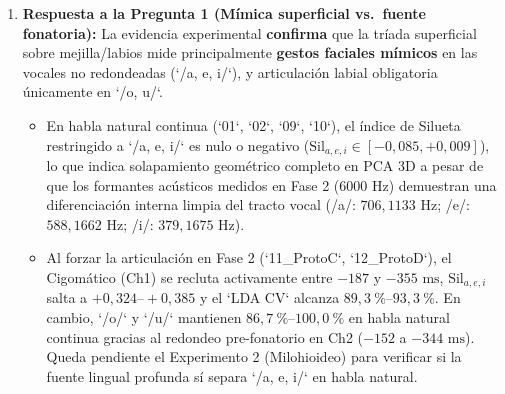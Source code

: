 \documentclass[11pt,a4paper]{article}
\begin{document}
\begin{enumerate}
    \item \textbf{Respuesta a la Pregunta 1 (M\'imica superficial vs.\ fuente fonatoria):} La evidencia experimental \textbf{confirma} que la tr\'iada superficial sobre mejilla/labios mide principalmente \textbf{gestos faciales m\'imicos} en las vocales no redondeadas (`/a, e, i/`), y articulaci\'on labial obligatoria \'unicamente en `/o, u/`.
    \begin{itemize}
        \item En habla natural continua (`01`, `02`, `09`, `10`), el \'indice de Silueta restringido a `/a, e, i/` es nulo o negativo ($\text{Sil}_{a,e,i} \in [-0{,}085, +0{,}009]$), lo que indica solapamiento geom\'etrico completo en PCA 3D a pesar de que los formantes ac\'usticos medidos en Fase 2 ($6000\text{ Hz}$) demuestran una diferenciaci\'on interna limpia del tracto vocal (/a/: $706,1133\text{ Hz}$; /e/: $588,1662\text{ Hz}$; /i/: $379,1675\text{ Hz}$).
        \item Al forzar la articulaci\'on en Fase 2 (`11\_ProtoC`, `12\_ProtoD`), el Cigom\'atico (Ch1) se recluta activamente entre $-187$ y $-355\text{ ms}$, $\text{Sil}_{a,e,i}$ salta a $+0{,}324\text{--}+0{,}385$ y el `LDA CV` alcanza $89{,}3\ \%\text{--}93{,}3\ \%$. En cambio, `/o/` y `/u/` mantienen $86{,}7\ \%\text{--}100{,}0\ \%$ en habla natural continua gracias al redondeo pre-fonatorio en Ch2 ($-152$ a $-344\text{ ms}$). Queda pendiente el Experimento 2 (Milohioideo) para verificar si la fuente lingual profunda s\'i separa `/a, e, i/` en habla natural.
    \end{itemize}


\end{enumerate}
\end{document}
